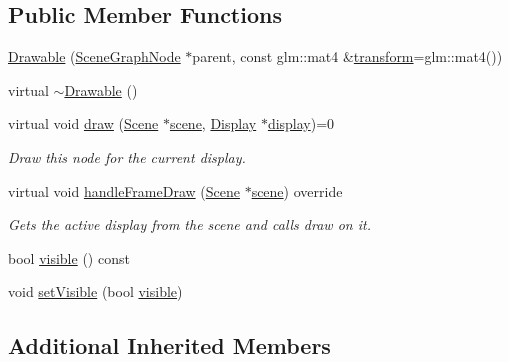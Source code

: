 \subsection*{Public Member Functions}
\begin{DoxyCompactItemize}
\item 
\hyperlink{classmotorcar_1_1Drawable_a48451c25ab7c1e379afec893f4c3d6f3}{Drawable} (\hyperlink{classmotorcar_1_1SceneGraphNode}{Scene\-Graph\-Node} $\ast$parent, const glm\-::mat4 \&\hyperlink{classmotorcar_1_1SceneGraphNode_ad96e79fdd739ac8223a3128003be391a}{transform}=glm\-::mat4())
\item 
virtual \hyperlink{classmotorcar_1_1Drawable_ab638464364b93a00bdeacc64cc85ba41}{$\sim$\-Drawable} ()
\item 
virtual void \hyperlink{classmotorcar_1_1Drawable_a8d0afa524298ae7f4ced15f6a80f253d}{draw} (\hyperlink{classmotorcar_1_1Scene}{Scene} $\ast$\hyperlink{classmotorcar_1_1SceneGraphNode_aa14e637ed4ae98f77e28941a4b5cfdd8}{scene}, \hyperlink{classmotorcar_1_1Display}{Display} $\ast$\hyperlink{structdisplay}{display})=0
\begin{DoxyCompactList}\small\item\em Draw this node for the current display. \end{DoxyCompactList}\item 
virtual void \hyperlink{classmotorcar_1_1Drawable_a8dce7e2370f9fdc5394cf661effc865a}{handle\-Frame\-Draw} (\hyperlink{classmotorcar_1_1Scene}{Scene} $\ast$\hyperlink{classmotorcar_1_1SceneGraphNode_aa14e637ed4ae98f77e28941a4b5cfdd8}{scene}) override
\begin{DoxyCompactList}\small\item\em Gets the active display from the scene and calls draw on it. \end{DoxyCompactList}\item 
bool \hyperlink{classmotorcar_1_1Drawable_ae76952e4af87589dbb7a4c9f17f2fdfa}{visible} () const 
\item 
void \hyperlink{classmotorcar_1_1Drawable_a3aa8dfd1f526d0cf744313e8e102cea4}{set\-Visible} (bool \hyperlink{classmotorcar_1_1Drawable_ae76952e4af87589dbb7a4c9f17f2fdfa}{visible})
\end{DoxyCompactItemize}
\subsection*{Additional Inherited Members}


